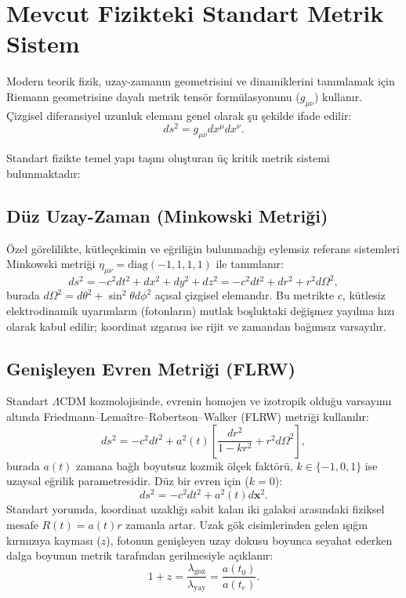 \section{Mevcut Fizikteki Standart Metrik Sistem}
\label{sec:standart_metrik}

Modern teorik fizik, uzay-zamanın geometrisini ve dinamiklerini tanımlamak için Riemann geometrisine dayalı metrik tensör formülasyonunu ($g_{\mu\nu}$) kullanır. Çizgisel diferansiyel uzunluk elemanı genel olarak şu şekilde ifade edilir:
\begin{equation}
    ds^2 = g_{\mu\nu} dx^\mu dx^\nu.
    \label{eq:genel_cizgi_elemani}
\end{equation}

Standart fizikte temel yapı taşını oluşturan üç kritik metrik sistemi bulunmaktadır:

\subsection{Düz Uzay-Zaman (Minkowski Metriği)}
Özel görelilikte, kütleçekimin ve eğriliğin bulunmadığı eylemsiz referans sistemleri Minkowski metriği $\eta_{\mu\nu} = \mathrm{diag}(-1, 1, 1, 1)$ ile tanımlanır:
\begin{equation}
    ds^2 = -c^2 dt^2 + dx^2 + dy^2 + dz^2 = -c^2 dt^2 + dr^2 + r^2 d\Omega^2,
    \label{eq:minkowski_metrik}
\end{equation}
burada $d\Omega^2 = d\theta^2 + \sin^2\theta d\phi^2$ açısal çizgisel elemandır. Bu metrikte $c$, kütlesiz elektrodinamik uyarımların (fotonların) mutlak boşluktaki değişmez yayılma hızı olarak kabul edilir; koordinat ızgarası ise rijit ve zamandan bağımsız varsayılır.

\subsection{Genişleyen Evren Metriği (FLRW)}
Standart $\Lambda$CDM kozmolojisinde, evrenin homojen ve izotropik olduğu varsayımı altında Friedmann--Lema\^itre--Robertson--Walker (FLRW) metriği kullanılır:
\begin{equation}
    ds^2 = -c^2 dt^2 + a^2(t) \left[ \frac{dr^2}{1 - kr^2} + r^2 d\Omega^2 \right],
    \label{eq:flrw_metrik}
\end{equation}
burada $a(t)$ zamana bağlı boyutsuz kozmik ölçek faktörü, $k \in \{-1, 0, 1\}$ ise uzaysal eğrilik parametresidir. Düz bir evren için ($k=0$):
\begin{equation}
    ds^2 = -c^2 dt^2 + a^2(t) d\mathbf{x}^2.
    \label{eq:flrw_duz}
\end{equation}
Standart yorumda, koordinat uzaklığı sabit kalan iki galaksi arasındaki fiziksel mesafe $R(t) = a(t) r$ zamanla artar. Uzak gök cisimlerinden gelen ışığın kırmızıya kayması ($z$), fotonun genişleyen uzay dokusu boyunca seyahat ederken dalga boyunun metrik tarafından gerilmesiyle açıklanır:
\begin{equation}
    1 + z = \frac{\lambda_{\mathrm{goz}}}{\lambda_{\mathrm{yay}}} = \frac{a(t_0)}{a(t_e)}.
    \label{eq:standart_redshift}
\end{equation}

